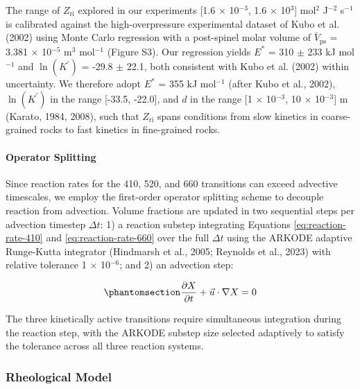 \documentclass[draft,linenumbers]{agujournal2019}
\begin{document}
The range of \(Z_\mathrm{ri}\) explored in our experiments {[}1.6
\(\times\) 10\(^{-3}\), 1.6 \(\times\) 10\(^3\){]} mol\(^2\) J\(^{-2}\)
s\(^{-1}\) is calibrated against the high-overpressure experimental
dataset of Kubo et al. (2002) using Monte Carlo regression with a
post-spinel molar volume of \(\bar{V}_\mathrm{ps}\) = 3.381 \(\times\)
10\(^{-5}\) m\(^3\) mol\(^{-1}\) (Figure S3). Our regression yields
\(E^{\ast}\) = 310 \(\pm\) 233 kJ mol\(^{-1}\) and \(\ln(K^{\prime})\) =
-29.8 \(\pm\) 22.1, both consistent with Kubo et al. (2002) within
uncertainty. We therefore adopt \(E^{\ast}\) = 355 kJ mol\(^{-1}\)
(after Kubo et al., 2002), \(\ln(K^{\prime})\) in the range {[}-33.5,
-22.0{]}, and \(d\) in the range {[}1 \(\times\) 10\(^{-3}\), 10
\(\times\) 10\(^{-3}\){]} m (Karato, 1984, 2008), such that
\(Z_\mathrm{ri}\) spans conditions from slow kinetics in coarse-grained
rocks to fast kinetics in fine-grained rocks.

\paragraph{Operator Splitting}\label{sec:operator-splitting}

Since reaction rates for the 410, 520, and 660 transitions can exceed
advective timescales, we employ the first-order operator splitting
scheme to decouple reaction from advection. Volume fractions are updated
in two sequential steps per advection timestep \(\Delta t\): 1) a
reaction substep integrating Equations \ref{eq:reaction-rate-410} and
\ref{eq:reaction-rate-660} over the full \(\Delta t\) using the ARKODE
adaptive Runge-Kutta integrator (Hindmarsh et al., 2005; Reynolds et
al., 2023) with relative tolerance 1 \(\times\) 10\(^{-6}\); and 2) an
advection step:

\begin{equation}\protect\phantomsection\label{eq:composition}{
  \frac{\partial X}{\partial t} + \vec{u} \cdot \nabla X = 0
}\end{equation}

The three kinetically active transitions require simultaneous
integration during the reaction step, with the ARKODE substep size
selected adaptively to satisfy the tolerance across all three reaction
systems.

\subsubsection{Rheological Model}\label{sec:rheological-model}
\end{document}

